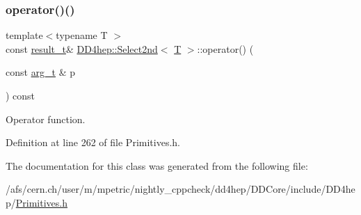 \subsubsection{\texorpdfstring{operator()()}{operator()()}}
{\footnotesize\ttfamily template$<$typename T $>$ \\
const \hyperlink{class_d_d4hep_1_1_select2nd_acfbf4d9607a113083ddcfa3b16385c2e}{result\+\_\+t}\& \hyperlink{class_d_d4hep_1_1_select2nd}{D\+D4hep\+::\+Select2nd}$<$ \hyperlink{class_t}{T} $>$\+::operator() (\begin{DoxyParamCaption}\item[{const \hyperlink{class_d_d4hep_1_1_select2nd_a1159f763d3e02055e64e1c757c0e05c0}{arg\+\_\+t} \&}]{p }\end{DoxyParamCaption}) const\hspace{0.3cm}{\ttfamily [inline]}}



Operator function. 



Definition at line 262 of file Primitives.\+h.



The documentation for this class was generated from the following file\+:\begin{DoxyCompactItemize}
\item 
/afs/cern.\+ch/user/m/mpetric/nightly\+\_\+cppcheck/dd4hep/\+D\+D\+Core/include/\+D\+D4hep/\hyperlink{_primitives_8h}{Primitives.\+h}\end{DoxyCompactItemize}
